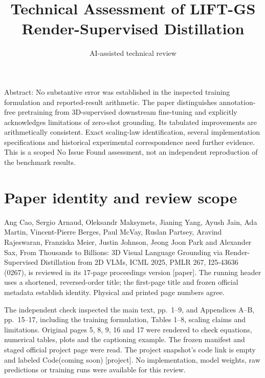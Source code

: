 \documentclass[10pt]{article}
\title{Technical Assessment of LIFT-GS Render-Supervised Distillation}
\author{AI-assisted technical review}
\date{}
\begin{document}
\maketitle
Abstract: No substantive error was established in the inspected training formulation and reported-result arithmetic. The paper distinguishes annotation-free pretraining from 3D-supervised downstream fine-tuning and explicitly acknowledges limitations of zero-shot grounding. Its tabulated improvements are arithmetically consistent. Exact scaling-law identification, several implementation specifications and historical experimental correspondence need further evidence. This is a scoped No Issue Found assessment, not an independent reproduction of the benchmark results.\par
\section*{Paper identity and review scope}
Ang Cao, Sergio Arnaud, Oleksandr Maksymets, Jianing Yang, Ayush Jain, Ada Martin, Vincent-Pierre Berges, Paul McVay, Ruslan Partsey, Aravind Rajeswaran, Franziska Meier, Justin Johnson, Jeong Joon Park and Alexander Sax, From Thousands to Billions: 3D Visual Language Grounding via Render-Supervised Distillation from 2D VLMs, ICML 2025, PMLR 267, I25-43636 (0267), is reviewed in its 17-page proceedings version [paper]. The running header uses a shortened, reversed-order title; the first-page title and frozen official metadata establish identity. Physical and printed page numbers agree.\par
The independent check inspected the main text, pp. 1–9, and Appendices A–B, pp. 15–17, including the training formulation, Tables 1–8, scaling claims and limitations. Original pages 5, 8, 9, 16 and 17 were rendered to check equations, numerical tables, plots and the captioning example. The frozen manifest and staged official project page were read. The project snapshot’s code link is empty and labeled Code(coming soon) [project]. No implementation, model weights, raw predictions or training runs were available for this review.\par
\end{document}
